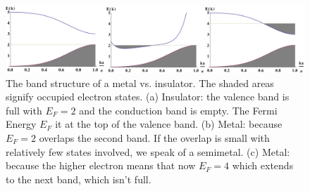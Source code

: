 \documentclass{Textbook}
\begin{document}

\begin{figure}[!ht] 
  \centering
  \includegraphics[width=15cm]{insmetal.png}
  \caption{The band structure of a metal vs. insulator. The shaded areas signify occupied electron states. (a) Insulator: the valence band is full with $E_F=2$ and the conduction band is empty. The Fermi Energy $E_F$ it at the top of the valence band. (b) Metal: because $E_F=2$ overlaps the second band. If the overlap is small with relatively few states involved, we speak of a semimetal. (c) Metal: because the higher electron means that now $E_F=4$ which extends to the next band, which isn't full.}
  \label{fig:metal_vs_insulator}
\end{figure}
\end{document}
